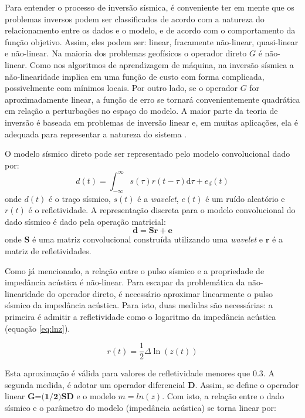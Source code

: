Para entender o processo de inversão sísmica, é conveniente ter em mente
que os problemas inversos podem ser classificados de acordo com a natureza
do relacionamento entre os dados e o modelo, e de acordo com o comportamento da função objetivo.
Assim, eles podem ser: linear, fracamente não-linear, quasi-linear e não-linear.
Na maioria dos problemas geofísicos o operador direto $G$ é não-linear.
Como nos algoritmos de aprendizagem de máquina, na inversão sísmica
a não-linearidade implica em uma função de custo com forma complicada,
possivelmente com mínimos locais.
Por outro lado, se o operador $G$ for aproximadamente linear, a
função de erro se tornará convenientemente quadrática em relação a perturbações
no espaço do modelo. A maior parte da teoria de inversão é baseada em problemas
de inversão linear e, em muitas aplicações, ela é 
adequada para representar a natureza do sistema \cite{sen_livro}.

O modelo sísmico direto pode ser representado pelo modelo convolucional dado por:
\begin{equation}
d(t) = \int_{-\infty}^{\infty} s(\tau) r(t - \tau)\mathrm{d}\tau + e_{d}(t)
\label{eq:conmodel}
\end{equation}
onde $d(t)$ é o traço sísmico, $s(t)$ é a \textit{wavelet}, $e(t)$ é
um ruído aleatório e $r(t)$ é o refletividade.
A representação discreta para o modelo convolucional do dado sísmico é
dado pela operação matricial: 
\begin{equation}
\label{eq:sismDiscreta}
\mathbf{d = Sr + e}
\end{equation}
onde $\mathbf{S}$ é uma matriz convolucional construída utilizando uma
\textit{wavelet} e $\mathbf{r}$  é a matriz de refletividades.

Como já mencionado, a relação entre o pulso sísmico e a
propriedade de impedância acústica é não-linear.
Para escapar da problemática da não-linearidade do operador direto, é
necessário aproximar linearmente o pulso sísmico da impedância acústica.
Para isto, duas medidas são necessárias: a primeira é admitir a 
refletividade como o logaritmo da impedância acústica (equação \ref{eq:lnz}).

\begin{equation}
r(t) = \frac{1}{2}\Delta \ln(z(t))
\label{eq:lnz}
\end{equation}

Esta aproximação é válida para valores de refletividade menores que $0.3$.
A segunda medida, é adotar um operador diferencial $\textbf{D}$. Assim,
se define o operador linear $\textbf{G=(1/2)SD}$ e o modelo $m=ln(z)$.
Com isto, a relação entre o dado sísmico e o parâmetro do modelo (impedância acústica)
se torna linear por:

